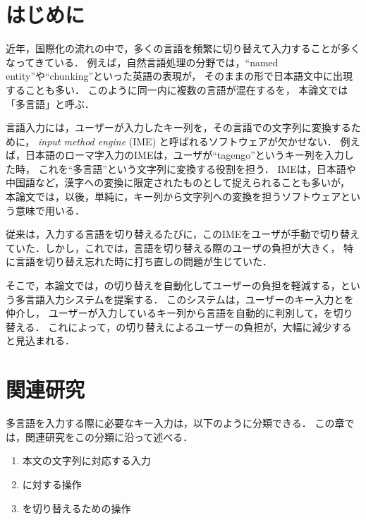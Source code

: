 \documentclass[japanese]{jnlp_1.4}
\newcommand{\name}{}
\renewcommand{\text}{}
\newcommand{\tes}{}
\begin{document}
\maketitle



\section{はじめに} 
\label{sec:introduction}
近年，国際化の流れの中で，多くの言語を頻繁に切り替えて入力することが多くなってきている．
例えば，自然言語処理の分野では，``named entity''や``chunking''といった英語の表現が，
そのままの形で日本語文中に出現することも多い．
このように同一{\text}内に複数の言語が混在する{\text}を，
本論文では「多言語{\text}」と呼ぶ．

言語入力には，ユーザーが入力したキー列を，その言語での文字列に変換するために，
{\em input method engine} (IME) と呼ばれるソフトウェアが欠かせない．
例えば，日本語のローマ字入力のIMEは，ユーザが``tagengo''というキー列を入力した時，
これを``多言語''という文字列に変換する役割を担う．
IMEは，日本語や中国語など，漢字への変換に限定されたものとして捉えられることも多いが，
本論文では，以後，単純に，キー列から文字列への変換を担うソフトウェアという意味で用いる．

従来は，入力する言語を切り替えるたびに，このIMEをユーザが手動で切り替えていた．しかし，これでは，言語を切り替える際のユーザの負担が大きく，
特に言語を切り替え忘れた時に打ち直しの問題が生じていた．

そこで，本論文では，{\tes}の切り替えを自動化してユーザーの負担を軽減する，{\name}という多言語入力システムを提案する\cite{typeanyijcnlp}．
このシステムは，ユーザーのキー入力と{\tes}を仲介し，
ユーザーが入力しているキー列から言語を自動的に判別して，{\tes}を切り替える．
これによって，{\tes}の切り替えによるユーザーの負担が，大幅に減少すると見込まれる．


\section{関連研究}

多言語{\text}を入力する際に必要なキー入力は，以下のように分類できる．
この章では，関連研究をこの分類に沿って述べる．
\begin{enumerate} 
\item 本文の文字列に対応する入力
\item {\tes}に対する操作
\item {\tes}を切り替えるための操作
\end{enumerate} 
\end{document}
